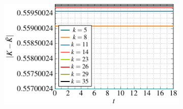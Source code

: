 \begin{figure}[t]
\begin{subfigure}[]{0.47\linewidth}
\caption{}
\label{fig:approx_error_incompressible_Euler}
\end{subfigure} \hfill
\begin{subfigure}[]{0.47\linewidth}
          \includegraphics[scale=1]{Figures/paper-figure3.pdf}

\end{subfigure}
\end{figure}
